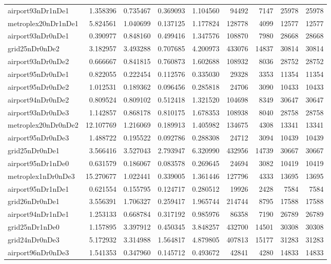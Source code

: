 \documentclass[../../../thesis.tex]{subfiles}
\begin{document}
\begin{longtable}{|l|r|r|r|r|r|r|r|r|}
airport93nDr1nDe1 & 1.358396 & 0.735467 & 0.369093 & 1.104560 & 94492 & 7147 & 25978 & 25978 \\
metroplex20nDr1nDe1 & 5.824561 & 1.040699 & 0.137125 & 1.177824 & 128778 & 4099 & 12577 & 12577 \\
airport93nDr0nDe1 & 0.390977 & 0.848160 & 0.499416 & 1.347576 & 108870 & 7980 & 28668 & 28668 \\
grid25nDr0nDe2 & 3.182957 & 3.493288 & 0.707685 & 4.200973 & 433076 & 14837 & 30814 & 30814 \\
airport93nDr0nDe2 & 0.666667 & 0.841815 & 0.760873 & 1.602688 & 108932 & 8036 & 28752 & 28752 \\
airport95nDr0nDe1 & 0.822055 & 0.222454 & 0.112576 & 0.335030 & 29328 & 3353 & 11354 & 11354 \\
airport95nDr0nDe2 & 1.012531 & 0.189362 & 0.096456 & 0.285818 & 24706 & 3090 & 10433 & 10433 \\
airport94nDr0nDe2 & 0.809524 & 0.809102 & 0.512418 & 1.321520 & 104698 & 8349 & 30647 & 30647 \\
airport93nDr0nDe3 & 1.142857 & 0.868178 & 0.810175 & 1.678353 & 108938 & 8040 & 28758 & 28758 \\
metroplex20nDr0nDe2 & 12.107769 & 1.216069 & 0.189913 & 1.405982 & 134675 & 4308 & 13341 & 13341 \\
airport95nDr0nDe3 & 1.488722 & 0.195522 & 0.092786 & 0.288308 & 24712 & 3094 & 10439 & 10439 \\
grid25nDr0nDe1 & 3.566416 & 3.527043 & 2.793947 & 6.320990 & 432956 & 14739 & 30667 & 30667 \\
airport95nDr1nDe0 & 0.631579 & 0.186067 & 0.083578 & 0.269645 & 24694 & 3082 & 10419 & 10419 \\
metroplex1nDr0nDe3 & 15.270677 & 1.022441 & 0.339005 & 1.361446 & 127796 & 4333 & 13695 & 13695 \\
airport95nDr1nDe1 & 0.621554 & 0.155795 & 0.124717 & 0.280512 & 19926 & 2428 & 7584 & 7584 \\
grid26nDr0nDe1 & 3.556391 & 1.706327 & 0.259417 & 1.965744 & 214744 & 8795 & 17588 & 17588 \\
airport94nDr1nDe1 & 1.253133 & 0.668784 & 0.317192 & 0.985976 & 86358 & 7190 & 26789 & 26789 \\
grid25nDr1nDe0 & 1.157895 & 3.397912 & 0.450345 & 3.848257 & 432700 & 14501 & 30308 & 30308 \\
grid24nDr0nDe3 & 5.172932 & 3.314988 & 1.564817 & 4.879805 & 407813 & 15177 & 31283 & 31283 \\
airport96nDr0nDe3 & 1.541353 & 0.347960 & 0.145712 & 0.493672 & 42841 & 4280 & 14833 & 14833 \\

\end{longtable}
\end{document}

